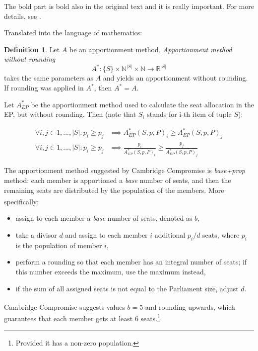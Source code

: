 \documentclass[a4paper]{article}
\theoremstyle{definition}
\newtheorem{definition}{Definition}[section]
\begin{document}
The bold part is bold also in the original text and it is really important. For more details, see \cite[p.~10]{cambridge}.

Translated into the language of mathematics:

\begin{definition}
	Let $A$ be an apportionment method. \textit{Apportionment method without rounding} $$A^*: \{S\} \times \mathbb{N}^{|S|} \times \mathbb{N} \rightarrow \mathbb{R}^{|S|}$$ takes the same parameters as $A$ and yields an apportionment without rounding. If rounding was applied in $A^*$, then  $A^* = A$.
\end{definition}

Let $A^*_{EP}$ be the apportionment method used to calculate the seat allocation in the EP, but without rounding. Then (note that $S_i$ stands for i-th item of tuple $S$):

\begin{align}
\forall i,j \in  1, ... ,|S|: p_i \ge p_j &\implies A_{EP}^*(S, p, P)_i \ge A_{EP}^*(S, p, P)_j \label{rule4} \\ 
\forall i,j \in  1, ... ,|S|: p_i \ge p_j &\implies \frac{p_i}{A_{EP}^*(S, p, P)_i} \ge \frac{p_j}{A_{EP}^*(S, p, P)_j} \label{rule5}
\end{align}

The apportionment method suggested by Cambridge Compromise is \textit{base+prop} method: each member is apportioned a \textit{base} number of seats, and then the remaining seats are distributed  by the population of the members. More specifically:\textsuperscript{\cite[p.~12]{cambridge}}
\begin{itemize}
	\item assign to each member a \textit{base} number of seats, denoted as $b$,
	\item take a divisor $d$ and assign to each member $i$ additional $p_i/d$ seats, where $p_i$ is the population of member $i$,
	\item perform a rounding so that each member has an integral number of seats; if this number exceeds the maximum, use the maximum instead,
	\item if the sum of all assigned seats is not equal to the Parliament size, adjust $d$.
\end{itemize}

Cambridge Compromise suggests values $b=5$ and rounding upwards\textsuperscript{\cite[p.~12]{cambridge}}, which guarantees that each member gets at least 6 seats.\footnote{Provided it has a non-zero population.}
\end{document}
